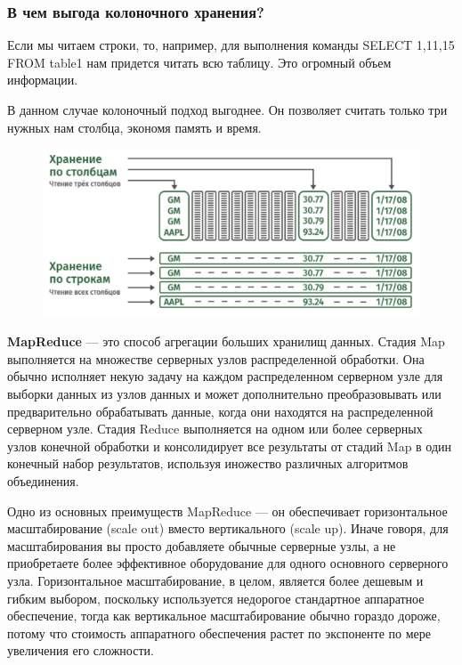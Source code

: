 \subsubsection{В чем выгода колоночного хранения?}

Если мы читаем строки, то, например, для выполнения команды
SELECT 1,11,15 FROM table1
нам придется читать всю таблицу. Это огромный объем информации.

В данном случае колоночный подход выгоднее. Он позволяет считать
только три нужных нам столбца, экономя память и время.

\begin{figure}[ht!]
	\centering
	\includegraphics[width=18cm, keepaspectratio]{assets/MPP-5.png}
	\caption{} 
\end{figure}
\FloatBarrier

\textbf{MapReduce} — это способ агрегации больших хранилищ данных. Стадия
Map выполняется на множестве серверных узлов распределенной
обработки. Она обычно исполняет некую задачу на каждом
распределенном серверном узле для выборки данных из узлов данных и
может дополнительно преобразовывать или предварительно обрабатывать
данные, когда они находятся на распределенной серверном узле. Стадия
Reduce выполняется на одном или более серверных узлов конечной
обработки и консолидирует все результаты от стадий Map в один конечный
набор результатов, используя иножество различных алгоритмов
объединения.

Одно из основных преимуществ MapReduce — он обеспечивает
горизонтальное масштабирование (scale out) вместо вертикального (scale
up). Иначе говоря, для масштабирования вы просто добавляете обычные
серверные узлы, а не приобретаете более эффективное оборудование для
одного основного серверного узла. Горизонтальное масштабирование, в
целом, является более дешевым и гибким выбором, поскольку
используется недорогое стандартное аппаратное обеспечение, тогда как
вертикальное масштабирование обычно гораздо дороже, потому что
стоимость аппаратного обеспечения растет по экспоненте по мере
увеличения его сложности.

